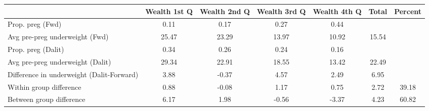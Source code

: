 \begin{tabular}{l*{6}{c}}
\toprule
            &\multicolumn{1}{c}{Wealth 1st Q}&\multicolumn{1}{c}{Wealth 2nd Q}&\multicolumn{1}{c}{Wealth 3rd Q}&\multicolumn{1}{c}{Wealth 4th Q}&\multicolumn{1}{c}{Total}&\multicolumn{1}{c}{Percent}\\
\midrule
\midrule
Prop. preg (Fwd)&        0.11&        0.17&        0.27&        0.44&            &            \\
Avg pre-preg underweight (Fwd)&       25.47&       23.29&       13.97&       10.92&       15.54&            \\
Prop. preg (Dalit)&        0.34&        0.26&        0.24&        0.16&            &            \\
Avg pre-preg underweight (Dalit)&       29.34&       22.91&       18.55&       13.42&       22.49&            \\
Difference in underweight (Dalit-Forward)&        3.88&       -0.37&        4.57&        2.49&        6.95&            \\
Within group difference&        0.88&       -0.08&        1.17&        0.75&        2.72&       39.18\\
Between group difference&        6.17&        1.98&       -0.56&       -3.37&        4.23&       60.82\\
\bottomrule
\end{tabular}
